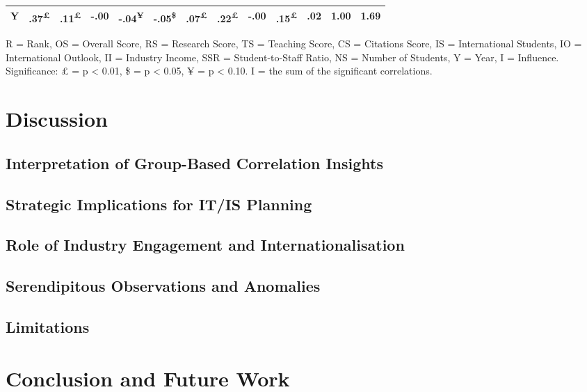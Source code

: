\documentclass{singlecol-new}
\theoremstyle{TH}{
\newtheorem{lemma}{Lemma}
\newtheorem{theorem}[lemma]{Theorem}
\newtheorem{corrolary}[lemma]{Corrolary}
\newtheorem{conjecture}[lemma]{Conjecture}
\newtheorem{proposition}[lemma]{Proposition}
\newtheorem{claim}[lemma]{Claim}
\newtheorem{stheorem}[lemma]{Wrong Theorem}
\newtheorem{algorithm}{Algorithm}
}
\theoremstyle{THrm}{
\newtheorem{definition}{Definition}[section]
\newtheorem{question}{Question}[section]
\newtheorem{remark}{Remark}
\newtheorem{scheme}{Scheme}
}
\theoremstyle{THhit}{
\newtheorem{case}{Case}[section]
}
\begin{document}
\begin{table*}[h!]
\begin{tabular}{lrrrrrrrrrrrr}
		Y  & \cellcolor{gray!18}.37\textsuperscript{£} & \cellcolor{gray!5}.11\textsuperscript{£} & \cellcolor{gray!0}-.00 & \cellcolor{gray!2}-.04\textsuperscript{¥} & \cellcolor{gray!2}-.05\textsuperscript{\$} & \cellcolor{gray!3}.07\textsuperscript{£} & \cellcolor{gray!11}.22\textsuperscript{£} & \cellcolor{gray!0}-.00 & \cellcolor{gray!7}.15\textsuperscript{£} & \cellcolor{gray!1}.02 & \cellcolor{gray!50}1.00 & 1.69 \\ \hline
	\end{tabular}
	
	
	\vspace{1mm}
	
\scriptsize
R = Rank, OS = Overall Score, RS = Research Score, TS = Teaching Score, CS = Citations Score, IS = International Students, IO = International Outlook, II = Industry Income, SSR = Student-to-Staff Ratio, NS = Number of Students, Y = Year, I = Influence. Significance: £ = p < 0.01, \$ = p < 0.05, ¥ = p < 0.10. I = the sum of the significant correlations.


\end{table*}


\section{Discussion}
\subsection{Interpretation of Group-Based Correlation Insights}
\subsection{Strategic Implications for IT/IS Planning}
\subsection{Role of Industry Engagement and Internationalisation}
\subsection{Serendipitous Observations and Anomalies}
\subsection{Limitations}

\section{Conclusion and Future Work}
\end{document}
